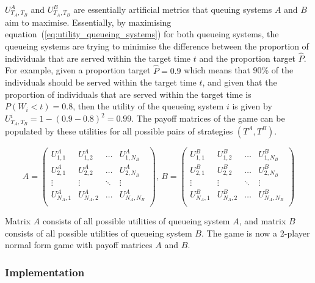 \(U_{T_A, T_B}^A\) and \(U_{T_A, T_B}^B\) are essentially artificial metrics
that queuing systems \(A\) and \(B\) aim to maximise.
Essentially, by maximising equation~(\ref{eq:utility_queueing_systems}) for both
queueing systems, the queueing systems are trying to minimise the difference
between the proportion of individuals that are served within the target time
\(t\) and the proportion target \(\hat{P}\).
For example, given a proportion target \(\hat{P} = 0.9\) which means that
90\% of the individuals should be served within the target time \(t\), and
given that the proportion of individuals that are served within the target time
is \(P(W_i < t) = 0.8\), then the utility of the queueing system \(i\) is
given by \(U_{T_A, T_B}^i = 1 - (0.9 - 0.8)^2 = 0.99\).
The payoff matrices of the game can be populated by these utilities for all
possible pairs of strategies \((T^A, T^B)\).

\begin{equation}\label{eq:payoff_matrices}
    A =
    \begin{pmatrix}
        U_{1,1}^A & U_{1,2}^A & \dots & U_{1,N_B}^A \\
        U_{2,1}^A & U_{2,2}^A & \dots & U_{2,N_B}^A \\
        \vdots & \vdots & \ddots & \vdots \\
        U_{N_A,1}^A & U_{N_A,2}^A & \dots & U_{N_A,N_B}^A \\
    \end{pmatrix}, \,
    B =
    \begin{pmatrix}
        U_{1,1}^B & U_{1,2}^B & \dots & U_{1,N_B}^B \\
        U_{2,1}^B & U_{2,2}^B & \dots & U_{2,N_B}^B \\
        \vdots & \vdots & \ddots & \vdots \\
        U_{N_A,1}^B & U_{N_A,2}^B & \dots & U_{N_A,N_B}^B \\
    \end{pmatrix}
\end{equation}

Matrix \(A\) consists of all possible utilities of queueing system \(A\), and
matrix \(B\) consists of all possible utilities of queueing system \(B\).
The game is now a 2-player normal form game with payoff matrices \(A\) and
\(B\).


\subsubsection{Implementation}

